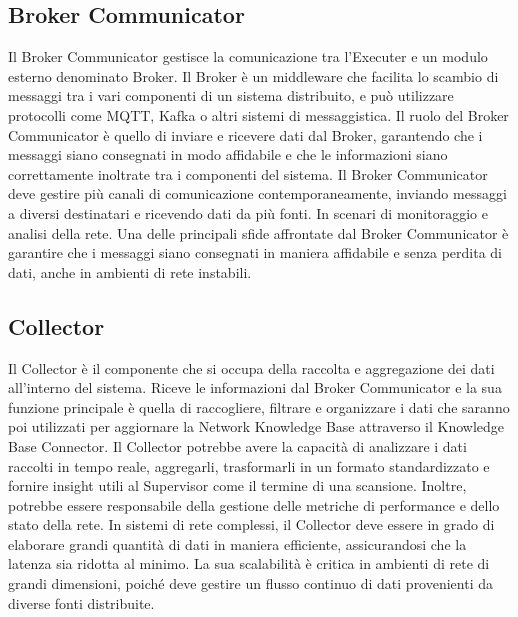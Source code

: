 \documentclass[target=bach,aauheader=,style=]{thud}
\begin{document}
\subsection{Broker Communicator}
Il Broker Communicator gestisce la comunicazione tra l'Executer e un modulo esterno denominato Broker. Il Broker è un middleware che facilita lo scambio di messaggi tra i vari componenti di un sistema distribuito, e può utilizzare protocolli come MQTT, Kafka o altri sistemi di messaggistica. Il ruolo del Broker Communicator è quello di inviare e ricevere dati dal Broker, garantendo che i messaggi siano consegnati in modo affidabile e che le informazioni siano correttamente inoltrate tra i componenti del sistema.
Il Broker Communicator deve gestire più canali di comunicazione contemporaneamente, inviando messaggi a diversi destinatari e ricevendo dati da più fonti. In scenari di monitoraggio e analisi della rete. Una delle principali sfide affrontate dal Broker Communicator è garantire che i messaggi siano consegnati in maniera affidabile e senza perdita di dati, anche in ambienti di rete instabili. 

\subsection{Collector}
Il Collector è il componente che si occupa della raccolta e aggregazione dei dati all'interno del sistema. Riceve le informazioni dal Broker Communicator e la sua funzione principale è quella di raccogliere, filtrare e organizzare i dati che saranno poi utilizzati per aggiornare la Network Knowledge Base attraverso il Knowledge Base Connector.
Il Collector potrebbe avere la capacità di analizzare i dati raccolti in tempo reale, aggregarli, trasformarli in un formato standardizzato e fornire insight utili al Supervisor come il termine di una scansione. Inoltre, potrebbe essere responsabile della gestione delle metriche di performance e dello stato della rete. In sistemi di rete complessi, il Collector deve essere in grado di elaborare grandi quantità di dati in maniera efficiente, assicurandosi che la latenza sia ridotta al minimo. La sua scalabilità è critica in ambienti di rete di grandi dimensioni, poiché deve gestire un flusso continuo di dati provenienti da diverse fonti distribuite.
\end{document}
